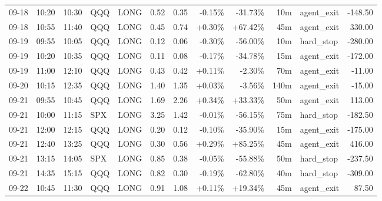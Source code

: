 \documentclass[11pt,a4paper,twoside]{article}
\begin{document}
\begin{center}
\begin{longtable}{>{\color{txtmain}}l l l l l r r r r r >{\color{txtmain}}l r}
09-18 & 10:20 & 10:30 & QQQ & LONG & 0.52 & 0.35 & \textcolor{lossred}{-0.15\%} & \textcolor{lossred}{-31.73\%} & 10m & agent\_exit & \textcolor{lossred}{-148.50} \\
09-18 & 10:55 & 11:40 & QQQ & LONG & 0.45 & 0.74 & \textcolor{wingreen}{+0.30\%} & \textcolor{wingreen}{+67.42\%} & 45m & agent\_exit & \textcolor{wingreen}{330.00} \\
09-19 & 09:55 & 10:05 & QQQ & LONG & 0.12 & 0.06 & \textcolor{lossred}{-0.30\%} & \textcolor{lossred}{-56.00\%} & 10m & hard\_stop & \textcolor{lossred}{-280.00} \\
09-19 & 10:20 & 10:35 & QQQ & LONG & 0.11 & 0.08 & \textcolor{lossred}{-0.17\%} & \textcolor{lossred}{-34.78\%} & 15m & agent\_exit & \textcolor{lossred}{-172.00} \\
09-19 & 11:00 & 12:10 & QQQ & LONG & 0.43 & 0.42 & \textcolor{wingreen}{+0.11\%} & \textcolor{lossred}{-2.30\%} & 70m & agent\_exit & \textcolor{lossred}{-11.00} \\
09-20 & 10:15 & 12:35 & QQQ & LONG & 1.40 & 1.35 & \textcolor{wingreen}{+0.03\%} & \textcolor{lossred}{-3.56\%} & 140m & agent\_exit & \textcolor{lossred}{-15.00} \\
09-21 & 09:55 & 10:45 & QQQ & LONG & 1.69 & 2.26 & \textcolor{wingreen}{+0.34\%} & \textcolor{wingreen}{+33.33\%} & 50m & agent\_exit & \textcolor{wingreen}{113.00} \\
09-21 & 10:00 & 11:15 & SPX & LONG & 3.25 & 1.42 & \textcolor{lossred}{-0.01\%} & \textcolor{lossred}{-56.15\%} & 75m & hard\_stop & \textcolor{lossred}{-182.50} \\
09-21 & 12:00 & 12:15 & QQQ & LONG & 0.20 & 0.12 & \textcolor{lossred}{-0.10\%} & \textcolor{lossred}{-35.90\%} & 15m & agent\_exit & \textcolor{lossred}{-175.00} \\
09-21 & 12:40 & 13:25 & QQQ & LONG & 0.30 & 0.56 & \textcolor{wingreen}{+0.29\%} & \textcolor{wingreen}{+85.25\%} & 45m & agent\_exit & \textcolor{wingreen}{416.00} \\
09-21 & 13:15 & 14:05 & SPX & LONG & 0.85 & 0.38 & \textcolor{lossred}{-0.05\%} & \textcolor{lossred}{-55.88\%} & 50m & hard\_stop & \textcolor{lossred}{-237.50} \\
09-21 & 14:35 & 15:15 & QQQ & LONG & 0.82 & 0.30 & \textcolor{lossred}{-0.19\%} & \textcolor{lossred}{-62.80\%} & 40m & hard\_stop & \textcolor{lossred}{-309.00} \\
09-22 & 10:45 & 11:30 & QQQ & LONG & 0.91 & 1.08 & \textcolor{wingreen}{+0.11\%} & \textcolor{wingreen}{+19.34\%} & 45m & agent\_exit & \textcolor{wingreen}{87.50} \\

\end{longtable}
\end{center}
\end{document}

